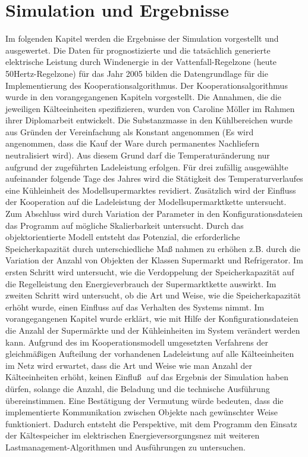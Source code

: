 \chapter{Simulation und Ergebnisse}
\minitoc
\label{chp:sue}
Im folgenden Kapitel werden die Ergebnisse der Simulation vorgestellt und
ausgewertet. Die Daten f\"ur prognostizierte und die tats\"achlich generierte
elektrische Leistung durch Windenergie in der Vattenfall-Regelzone (heute
50Hertz-Regelzone) f\"ur das Jahr 2005 bilden die Datengrundlage f\"ur die
Implementierung des Kooperationsalgorithmus. Der Kooperationsalgorithmus wurde
in den vorangegangenen Kapiteln vorgestellt. Die Annahmen, die die jeweiligen
K\"alteeinheiten spezifizieren, wurden von Caroline M\"oller im Rahmen ihrer
Diplomarbeit entwickelt\cite{caro}. Die Substanzmasse in den K\"uhlbereichen
wurde aus Gr\"unden der Vereinfachung als Konstant angenommen (Es wird
angenommen, dass die Kauf der Ware durch permanentes Nachliefern neutralisiert
wird). Aus diesem Grund darf die Temperatur\"anderung nur aufgrund der
zugef\"uhrten Ladeleistung erfolgen. F\"ur drei zuf\"allig ausgew\"ahlte
aufeinander folgende Tage des Jahres wird die St\"atigkeit des
Temperaturverlaufes eine K\"uhleinheit des Modellsupermarktes revidiert.
Zus\"atzlich wird der Einfluss der Kooperation auf die Ladeleistung der
Modellsupermarktkette untersucht. Zum Abschluss wird durch Variation der
Parameter in den Konfigurationsdateien das Programm auf m\"ogliche
Skalierbarkeit untersucht. Durch das objektorientierte Modell entsteht das
Potenzial, die erforderliche Speicherkapazit\"at durch unterschiedliche Ma\ss
nahmen zu erh\"ohen z.B. durch die Variation der Anzahl von Objekten der Klassen
Supermarkt und Refrigerator. Im ersten Schritt wird untersucht, wie die
Verdoppelung der Speicherkapazit\"at auf die Regelleistung den Energieverbrauch
der Supermarktkette auswirkt. Im zweiten Schritt wird untersucht, ob die Art und
Weise, wie die Speicherkapazit\"at erh\"oht wurde, einen Einfluss auf das
Verhalten des Systems nimmt. Im vorangegangenen Kapitel wurde erkl\"art, wie mit
Hilfe der Konfigurationsdateien die Anzahl der Superm\"arkte und der
K\"uhleinheiten im System ver\"andert werden kann. Aufgrund des im
Kooperationsmodell umgesetzten Verfahrens der gleichm\"a\ss igen Aufteilung der
vorhandenen Ladeleistung auf alle K\"alteeinheiten im Netz wird erwartet, dass
die Art und Weise wie man Anzahl der K\"alteeinheiten erh\"oht, keinen Einflu\ss
$ $ auf das Ergebnis der Simulation haben d\"urfen, solange die Anzahl, die
Beladung und die technische Ausf\"uhrung \"ubereinstimmen. Eine Best\"atigung
der Vermutung w\"urde bedeuten, dass die implementierte Kommunikation zwischen
Objekte nach gew\"unschter Weise funktioniert. Dadurch entsteht die Perspektive,
mit dem Programm den Einsatz der K\"altespeicher im elektrischen
Energieversorgungsnez mit weiteren Lastmanagement-Algorithmen und Ausf\"uhrungen
zu untersuchen.

